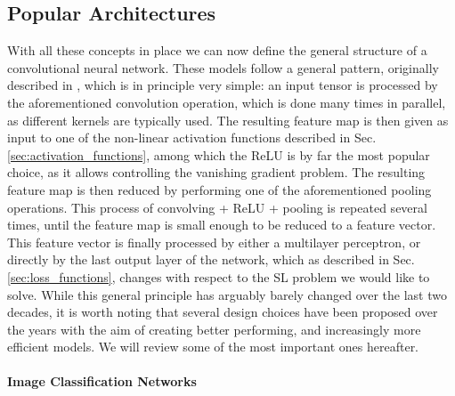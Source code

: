 \subsection{Popular Architectures}
\label{sec:architectures}

With all these concepts in place we can now define the general structure of a convolutional neural network. These models follow a general pattern, originally described in \cite{lecun1998gradient}, which is in principle very simple: an input tensor is processed by the aforementioned convolution operation, which is done many times in parallel, as different kernels are typically used. The resulting feature map is then given as input to one of the non-linear activation functions described in Sec. \ref{sec:activation_functions}, among which the ReLU is by far the most popular choice, as it allows controlling the vanishing gradient problem. The resulting feature map is then reduced by performing one of the aforementioned pooling operations. This process of convolving + ReLU + pooling is repeated several times, until the feature map is small enough to be reduced to a feature vector. This feature vector is finally processed by either a multilayer perceptron, or directly by the last output layer of the network, which as described in Sec. \ref{sec:loss_functions}, changes with respect to the SL problem we would like to solve. While this general principle has arguably barely changed over the last two decades, it is worth noting that several design choices have been proposed over the years with the aim of creating better performing, and increasingly more efficient models. We will review some of the most important ones hereafter.  

\paragraph{Image Classification Networks}

